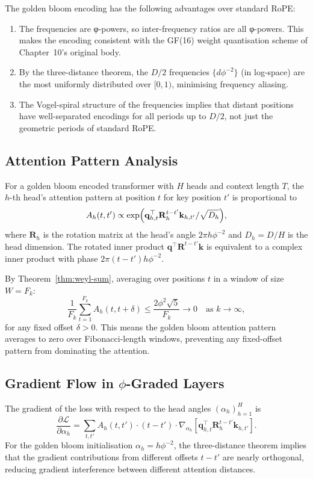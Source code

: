 The golden bloom encoding has the following advantages over standard
RoPE:
\begin{enumerate}
  \item The frequencies are φ-powers, so inter-frequency ratios are all
        φ-powers.  This makes the encoding consistent with the GF(16)
        weight quantisation scheme of Chapter~10's original body.
  \item By the three-distance theorem, the $D/2$ frequencies $\{d\phi^{-2}\}$
        (in log-space) are the most uniformly distributed over $[0,1)$,
        minimising frequency aliasing.
  \item The Vogel-spiral structure of the frequencies implies that
        distant positions have well-separated encodings for all periods
        up to $D/2$, not just the geometric periods of standard RoPE.
\end{enumerate}

\subsection{Attention Pattern Analysis}
\label{subsec:attention-analysis}

For a golden bloom encoded transformer with $H$ heads and context
length $T$, the $h$-th head's attention pattern at position $t$ for
key position $t'$ is proportional to
\[
  A_h(t, t') \propto \exp\Bigl(\mathbf{q}_{h,t}^\top
  \mathbf{R}_{h}^{t-t'} \mathbf{k}_{h,t'} / \sqrt{D_h}\Bigr),
\]
where $\mathbf{R}_{h}$ is the rotation matrix at the head's angle
$2\pi h\phi^{-2}$ and $D_h = D/H$ is the head dimension.  The rotated
inner product $\mathbf{q}^\top \mathbf{R}^{t-t'} \mathbf{k}$ is
equivalent to a complex inner product with phase $2\pi(t-t')h\phi^{-2}$.

By Theorem~\ref{thm:weyl-sum}, averaging over positions $t$ in a window
of size $W = F_k$:
\[
  \frac{1}{F_k} \sum_{t=1}^{F_k} A_h(t, t+\delta)
  \leq \frac{2\phi^2\sqrt{5}}{F_k} \to 0 \quad \text{as } k \to \infty,
\]
for any fixed offset $\delta > 0$.  This means the golden bloom
attention pattern averages to zero over Fibonacci-length windows,
preventing any fixed-offset pattern from dominating the attention.

\subsection{Gradient Flow in $\phi$-Graded Layers}
\label{subsec:gradient-flow}

The gradient of the loss with respect to the head angles
$(\alpha_h)_{h=1}^H$ is
\[
  \frac{\partial \mathcal{L}}{\partial \alpha_h}
  = \sum_{t, t'} A_h(t,t') \cdot (t - t') \cdot
    \nabla_{\alpha_h}[\mathbf{q}_{h,t}^\top \mathbf{R}_{h}^{t-t'}\mathbf{k}_{h,t'}].
\]
For the golden bloom initialisation $\alpha_h = h\phi^{-2}$, the
three-distance theorem implies that the gradient contributions from
different offsets $t - t'$ are nearly orthogonal, reducing gradient
interference between different attention distances.

